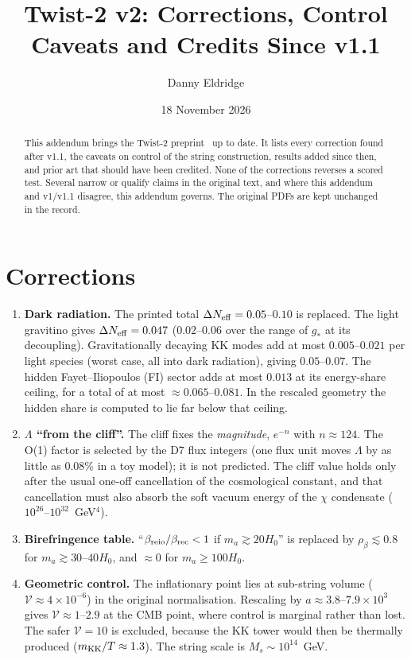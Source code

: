 \documentclass[aps,prd,twocolumn,superscriptaddress,nofootinbib,showkeys]{revtex4-2}
\begin{document}
\title{Twist-2 v2: Corrections, Control Caveats and Credits Since v1.1}
\author{Danny Eldridge}
\date{18 November 2026}
\begin{abstract}
This addendum brings the Twist-2 preprint~\cite{T2,T21} up to date. It lists every correction found after v1.1, the caveats on control of the string construction, results added since then, and prior art that should have been credited. None of the corrections reverses a scored test. Several narrow or qualify claims in the original text, and where this addendum and v1/v1.1 disagree, this addendum governs. The original PDFs are kept unchanged in the record.
\end{abstract}
\maketitle

\section{Corrections}
\begin{enumerate}
\item \textbf{Dark radiation.} The printed total $\Delta N_{\rm eff}=0.05$--$0.10$ is replaced. The light gravitino gives $\Delta N_{\rm eff}=0.047$ ($0.02$--$0.06$ over the range of $g_*$ at its decoupling). Gravitationally decaying KK modes add at most $0.005$--$0.021$ per light species (worst case, all into dark radiation), giving $0.05$--$0.07$. The hidden Fayet--Iliopoulos (FI) sector adds at most $0.013$ at its energy-share ceiling, for a total of at most $\approx0.065$--$0.081$. In the rescaled geometry the hidden share is computed to lie far below that ceiling.
\item \textbf{$\Lambda$ ``from the cliff''.} The cliff fixes the \emph{magnitude}, $e^{-n}$ with $n\approx124$. The O(1) factor is selected by the D7 flux integers (one flux unit moves $\Lambda$ by as little as 0.08\% in a toy model); it is not predicted. The cliff value holds only after the usual one-off cancellation of the cosmological constant, and that cancellation must also absorb the soft vacuum energy of the $\chi$ condensate ($10^{26}$--$10^{32}$~GeV$^4$).
\item \textbf{Birefringence table.} ``$\beta_{\rm reio}/\beta_{\rm rec}<1$ if $m_a\gtrsim20H_0$'' is replaced by $\rho_\beta\lesssim0.8$ for $m_a\gtrsim30$--$40H_0$, and $\approx0$ for $m_a\ge100H_0$.
\item \textbf{Geometric control.} The inflationary point lies at sub-string volume ($\mathcal V\approx4\times10^{-6}$) in the original normalisation. Rescaling by $a\approx3.8$--$7.9\times10^3$ gives $\mathcal V\approx1$--$2.9$ at the CMB point, where control is marginal rather than lost. The safer $\mathcal V=10$ is excluded, because the KK tower would then be thermally produced ($m_{\rm KK}/T\approx1.3$). The string scale is $M_s\sim10^{14}$~GeV.
\end{enumerate}
\end{document}
